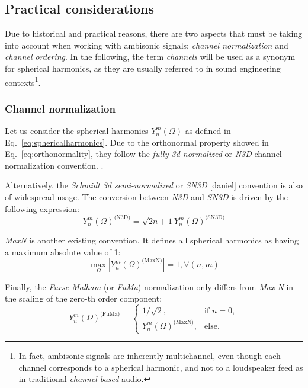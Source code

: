 \subsection{Practical considerations}

Due to historical and practical reasons, there are two aspects that must be taking into account when working with ambisonic signals: \textit{channel normalization} and \textit{channel ordering}. 
In the following, the term \textit{channels} will be used as a synonym for spherical harmonics, as they are usually referred to in sound engineering contexts\footnote{In fact, ambisonic signals are inherently multichannel, even though each channel corresponds to a spherical harmonic, and not to a loudspeaker feed as in traditional \textit{channel-based} audio.}.  \\


\subsubsection{Channel normalization}
Let us consider the spherical harmonics $Y_n^m(\Omega)$ as defined in Eq.~\ref{eq:sphericalharmonics}. Due to the orthonormal property showed in Eq.~\ref{eq:orthonormality}, they follow the \textit{fully 3d normalized} or \textit{N3D} channel normalization convention. . 

Alternatively, the \textit{Schmidt 3d semi-normalized} or \textit{SN3D} [daniel] convention is also of widespread usage. The conversion between \textit{N3D} and \textit{SN3D} is driven by the following expression:
\begin{equation}
	{Y_n^m(\Omega)}^{\text{(N3D)}} = \sqrt{2n+1} {Y_n^m(\Omega)}^{\text{(SN3D)}}
\end{equation}

\textit{MaxN} is another existing convention. It defines all spherical harmonics as having a maximum absolute value of 1: 
\begin{equation}
	\max_{\Omega} |{Y_n^m(\Omega)}^{\text{(MaxN)}}| = 1, \forall (n, m)
\end{equation} 

Finally, the \textit{Furse-Malham} (or \textit{FuMa}) normalization only differs from \textit{Max-N} in the scaling of the zero-th order component: 
\begin{equation}
	{Y_n^m(\Omega)}^{\text{(FuMa)}} = \begin{cases}
		1 / \sqrt{2},  &\text{if } n = 0,\\
		{Y_n^m(\Omega)}^{\text{(MaxN)}},  &\text{else}.
	\end{cases}	
\end{equation} 

